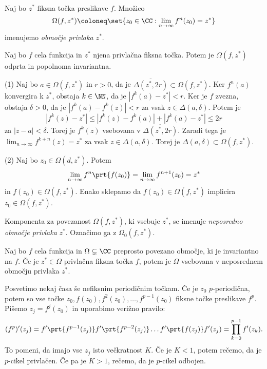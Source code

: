 \begin{definicija}
    Naj bo \(z^*\) fiksna točka preslikave \(f\). Množico
    \[\Omega (f, z^*) \coloneq \set{z_0 \in \CC : \lim_{n \to \infty} f^n (z_0) = z^*}\]
    imenujemo \emph{območje privlaka \(z^*\)}.
\end{definicija}

\begin{izrek}
    Naj bo \(f\) cela funkcija in \(z^*\) njena privlačna fiksna točka. Potem je \(\Omega (f, z^*)\) odprta in popolnoma invariantna.
\end{izrek}

\begin{dokaz}
    (1) Naj bo \(a \in \Omega (f, z^*)\) in \(r > 0\), da je \(\overline{\Delta (z^*, 2r)} \subset \Omega (f, z^*)\). Ker \(f^n (a)\) konvergira k \(z^*\), obstaja \(k \in \NN\), da je \(|f^k (a) - z^*| < r\). Ker je \(f\) zvezna, obstaja \(\delta > 0\), da je \(|f^k (a) - f^k (z)| < r\) za vsak \(z \in \Delta (a, \delta)\). Potem je
    \[|f^k (z) - z^*| \leq |f^k (z) - f^k (a)| + |f^k (a) - z^*| \leq 2r\]
    za \(|z - a| < \delta\). Torej je \(f^k (z)\) vsebovana v \(\overline{\Delta (z^*, 2r)}\). Zaradi tega je \(\lim_{n \to \infty} f^{k + n} (z) = z^*\) za vsak \(z \in \Delta (a, \delta)\). Torej je \(\Delta (a, \delta) \subset \Omega (f, z^*)\).

    (2) Naj bo \(z_0 \in \Omega (d, z^*)\). Potem
    \[\lim_{n \to \infty} f^n \prt{f (z_0)} = \lim_{n \to \infty} f^{n + 1} (z_0) = z^*\]
    in \(f (z_0) \in \Omega(f, z^*)\). Enako sklepamo da \(f (z_0) \in \Omega (f, z^*)\) implicira \(z_0 \in \Omega (f, z^*)\).
\end{dokaz}

\noindent Komponenta za povezanost \(\Omega (f, z^*)\), ki vsebuje \(z^*\), se imenuje \emph{neposredno območje privlaka} \(z^*\). Označimo ga z \(\Omega_0 (f, z^*)\).

\begin{trditev} \label{prop:privlak}
    Naj bo \(f\) cela funkcija in \(\Omega \subsetneq \CC\) preprosto povezano območje, ki je invariantno na \(f\). Če je \(z^{*} \in \Omega\) privlačna fiksna točka \(f\), potem je \(\Omega\) vsebovana v neposrednem območju privlaka \(z^*\).
\end{trditev}

Posvetimo nekaj časa še nefiksnim periodičnim točkam. Če je \(z_0\) \(p\)-periodična, potem so vse točke \(z_0, f (z_0), f^2 (z_0), \dots, f^{p - 1} (z_0)\) fiksne točke preslikave \(f^p\). Pišemo \(z_j = f^j (z_0)\) in uporabimo verižno pravilo:
\[(f^p)' (z_j) = f' \prt{f^{p - 1} (z_j)} f' \prt{f^{p - 2} (z_j)} \dots f' \prt{f (z_j)} f' (z_j) = \prod_{k = 0}^{p - 1} f' (z_k).\]
To pomeni, da imajo vse \(z_j\) isto večkratnost \(K\). Če je \(K < 1\), potem rečemo, da je \(p\)-cikel privlačen. Če pa je \(K > 1\), rečemo, da je \(p\)-cikel odbojen.

